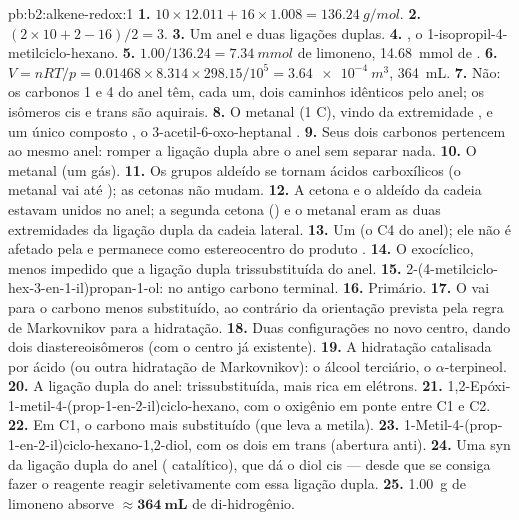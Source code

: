 \begin{solution}{pb:b2:alkene-redox:1}
\textbf{1.} $10 \times 12.011 + 16 \times 1.008 = \qty{136.24}{g/mol}$.
\textbf{2.} $(2 \times 10 + 2 - 16)/2 = 3$.
\textbf{3.} Um anel e duas ligações duplas.
\textbf{4.} , o 1-isopropil-4-metilciclo-hexano.
\textbf{5.} $1.00/136.24 = \qty{7.34}{mmol}$ de limoneno, \qty{14.68}{mmol} de .
\textbf{6.} $V = nRT/p = 0.01468 \times 8.314 \times 298.15/10^5 = \qty{3.64e-4}{m^3}$,
\qty{364}{mL}.
\textbf{7.} Não: os carbonos 1 e 4 do anel têm, cada um, dois caminhos idênticos
pelo anel; os isômeros cis e trans são aquirais.
\textbf{8.} O metanal  (1 C), vindo da extremidade , e um único
composto , o 3-acetil-6-oxo-heptanal .
\textbf{9.} Seus dois carbonos pertencem ao mesmo anel: romper a ligação dupla
abre o anel sem separar nada.
\textbf{10.} O metanal (um gás).
\textbf{11.} Os grupos aldeído se tornam ácidos carboxílicos (o metanal vai até
); as cetonas não mudam.
\textbf{12.} A cetona e o aldeído da cadeia  estavam unidos no anel; a
segunda cetona () e o metanal eram as duas extremidades da ligação
dupla da cadeia lateral.
\textbf{13.} Um (o C4 do anel); ele não é afetado pela  e permanece como
estereocentro do produto .
\textbf{14.} O  exocíclico, menos impedido que a ligação dupla
trissubstituída do anel.
\textbf{15.} 2-(4-metilciclo-hex-3-en-1-il)propan-1-ol:  no antigo
carbono terminal.
\textbf{16.} Primário.
\textbf{17.} O  vai para o carbono menos substituído, ao contrário da
orientação prevista pela regra de Markovnikov para a hidratação.
\textbf{18.} Duas configurações no novo centro, dando dois diastereoisômeros (com
o centro já existente).
\textbf{19.} A hidratação catalisada por ácido (ou outra hidratação de
Markovnikov): o álcool terciário, o $\alpha$-terpineol.
\textbf{20.} A ligação dupla do anel: trissubstituída, mais rica em elétrons.
\textbf{21.} 1,2-Epóxi-1-metil-4-(prop-1-en-2-il)ciclo-hexano, com o oxigênio em
ponte entre C1 e C2.
\textbf{22.} Em C1, o carbono mais substituído (que leva a metila).
\textbf{23.} 1-Metil-4-(prop-1-en-2-il)ciclo-hexano-1,2-diol, com os dois  em
trans (abertura anti).
\textbf{24.} Uma  syn da ligação dupla do anel (
catalítico), que dá o diol cis --- desde que se consiga fazer o reagente
reagir seletivamente com essa ligação dupla.
\textbf{25.} \qty{1.00}{g} de limoneno absorve $\boldsymbol{\approx \qty{364}{mL}}$ de
di-hidrogênio.
\end{solution}
